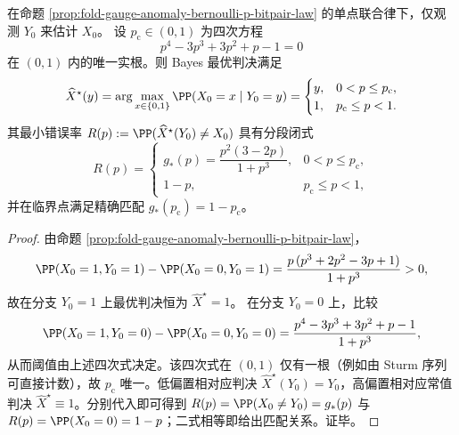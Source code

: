 \begin{proposition}\label{prop:fold-gauge-anomaly-bernoulli-p-bayes-phase-transition}
在命题 \ref{prop:fold-gauge-anomaly-bernoulli-p-bitpair-law} 的单点联合律下，仅观测 \(Y_0\) 来估计 \(X_0\)。
设 \(p_{\mathrm c}\in(0,1)\) 为四次方程
\[
p^4-3p^3+3p^2+p-1=0
\]
在 \((0,1)\) 内的唯一实根。则 Bayes 最优判决满足
\[
\widehat X^\star(y)
=\arg\max_{x\in\{0,1\}}\PP(X_0=x\mid Y_0=y)
=
\begin{cases}
y,& 0<p\le p_{\mathrm c},\\
1,& p_{\mathrm c}\le p<1.
\end{cases}
\]
其最小错误率 \(R(p):=\PP(\widehat X^\star(Y_0)\neq X_0)\) 具有分段闭式
\[
R(p)=
\begin{cases}
g_\ast(p)=\dfrac{p^2(3-2p)}{1+p^3},& 0<p\le p_{\mathrm c},\\[4pt]
1-p,& p_{\mathrm c}\le p<1,
\end{cases}
\]
并在临界点满足精确匹配 \(g_\ast(p_{\mathrm c})=1-p_{\mathrm c}\)。
\end{proposition}
\begin{proof}
由命题 \ref{prop:fold-gauge-anomaly-bernoulli-p-bitpair-law}，
\[
\PP(X_0=1,Y_0=1)-\PP(X_0=0,Y_0=1)
=\frac{p\,(p^3+2p^2-3p+1)}{1+p^3}>0,
\]
故在分支 \(Y_0=1\) 上最优判决恒为 \(\widehat X^\star=1\)。
在分支 \(Y_0=0\) 上，比较
\[
\PP(X_0=1,Y_0=0)-\PP(X_0=0,Y_0=0)
=\frac{p^4-3p^3+3p^2+p-1}{1+p^3},
\]
从而阈值由上述四次式决定。该四次式在 \((0,1)\) 仅有一根（例如由 Sturm 序列可直接计数），故 \(p_{\mathrm c}\) 唯一。低偏置相对应判决 \(\widehat X^\star(Y_0)=Y_0\)，高偏置相对应常值判决 \(\widehat X^\star\equiv1\)。分别代入即可得到
\(R(p)=\PP(X_0\neq Y_0)=g_\ast(p)\) 与 \(R(p)=\PP(X_0=0)=1-p\)；二式相等即给出匹配关系。证毕。
\end{proof}

